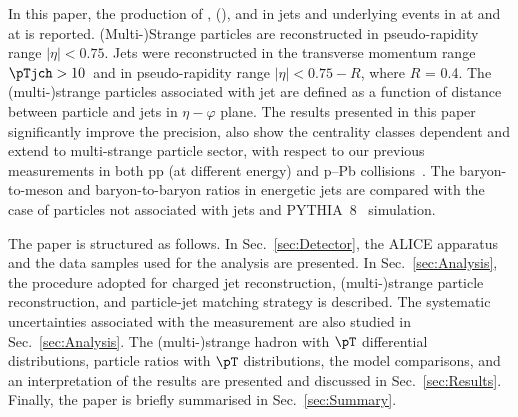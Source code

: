
In this paper, the production of \kzero, \lmb (\almb), \Xis and \Oms in jets and underlying events in \pp at \thirteen and \pPb at \fivenn is reported.
(Multi-)Strange particles are reconstructed in pseudo-rapidity range $|\eta| < 0.75$.
Jets were reconstructed in the transverse momentum range $\pTjch > 10$~\GeVc and in pseudo-rapidity range $|\eta| < 0.75 - R$, where $R$ = 0.4.
The (multi-)strange particles associated with jet are defined as a function of distance between particle and jets in $\eta-\varphi$ plane.
The results presented in this paper significantly improve the precision, also show the centrality classes dependent and extend to multi-strange particle sector, with respect to our previous measurements in both pp (at different energy) and p–Pb collisions~\cite{V0injet}.
The baryon-to-meson and baryon-to-baryon ratios in energetic jets are compared with the case of particles not associated with jets and PYTHIA~8~\cite{Sjostrand:2014zea} simulation.

The paper is structured as follows.
In Sec.~\ref{sec:Detector}, the ALICE apparatus and the data samples used for the analysis are presented. In Sec.~\ref{sec:Analysis}, the procedure adopted for charged jet reconstruction, (multi-)strange particle reconstruction, and particle-jet matching strategy is described.
The systematic uncertainties associated with the measurement are also studied in Sec.~\ref{sec:Analysis}.
The (multi-)strange hadron with $\pT$ differential distributions, particle ratios with $\pT$ distributions, the model comparisons, and an interpretation of the results are presented and discussed in Sec.~\ref{sec:Results}. Finally, the paper is briefly summarised in Sec.~\ref{sec:Summary}. 